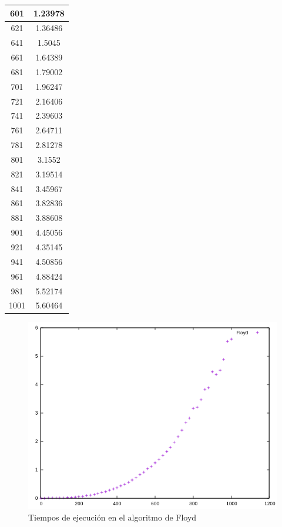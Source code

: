 \documentclass{article}
\begin{document}
\begin{longtable}{|c||c|}
	601     & 1.23978 \\ \hline
	621     & 1.36486 \\ \hline
	641     & 1.5045 \\ \hline
	661     & 1.64389 \\ \hline
	681     & 1.79002 \\ \hline
	701     & 1.96247 \\ \hline
	721     & 2.16406 \\ \hline
	741     & 2.39603 \\ \hline
	761     & 2.64711 \\ \hline
	781     & 2.81278 \\ \hline
	801     & 3.1552 \\ \hline
	821     & 3.19514 \\ \hline
	841     & 3.45967 \\ \hline
	861     & 3.82836 \\ \hline
	881     & 3.88608 \\ \hline
	901     & 4.45056 \\ \hline
	921     & 4.35145 \\ \hline
	941     & 4.50856 \\ \hline
	961     & 4.88424 \\ \hline
	981     & 5.52174 \\ \hline
	1001    & 5.60464 \\ \hline
\end{longtable}
\begin{figure}[H]
	\centering
	\includegraphics[totalheight=8cm]{img/floyd}
	\caption{Tiempos de ejecución en el algoritmo de Floyd}
	\label{fig:floyd}
\end{figure}
\end{document}

